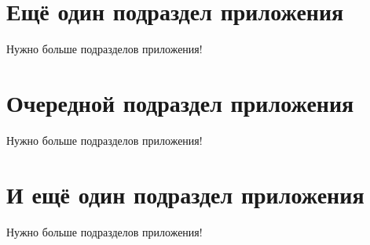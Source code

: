 \fontsize{14pt}{15pt}\selectfont
\section{Ещё один подраздел приложения} \label{AppendixB2}

Нужно больше подразделов приложения!

\section{Очередной подраздел приложения} \label{AppendixB3}

Нужно больше подразделов приложения!

\section{И ещё один подраздел приложения} \label{AppendixB4}

Нужно больше подразделов приложения!


